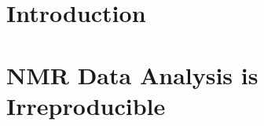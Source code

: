 \documentclass[a4paper]{report}
\begin{document}








\tableofcontents

\listoftables

\listoffigures

\chapter{Introduction}



\chapter{NMR Data Analysis is Irreproducible}




%


\end{document}
